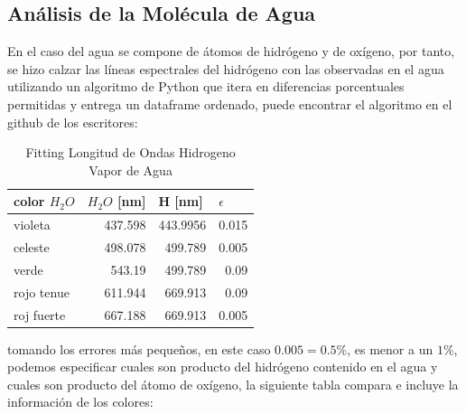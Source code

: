 \documentclass[a4paper,twocolumn,10pt]{article}
\begin{document}
\subsection{Análisis de la Molécula de Agua}

En el caso del agua se compone de átomos de hidrógeno y de oxígeno, por tanto, se hizo calzar las líneas espectrales del hidrógeno con las observadas en el agua utilizando un algoritmo de Python que itera en diferencias porcentuales permitidas y entrega un dataframe ordenado, puede encontrar el algoritmo en el github de los escritores: \cite{github}

\begin{table}[H]
\centering
\begin{tabular}{|l|r|r|r|}
\hline
color $H_2O$     & \multicolumn{1}{l}{$H_2O$ [nm]} & \multicolumn{1}{|l|}{H [nm]} & \multicolumn{1}{l|}{$\epsilon$}  \\
\hline
violeta    & 437.598                            & 443.9956                                  & 0.015                                       \\
celeste    & 498.078                            & 499.789                                   & 0.005                                       \\
verde    & 543.19                             & 499.789                                   & 0.09                                        \\
rojo tenue & 611.944                            & 669.913                                   & 0.09                                        \\
roj fuerte & 667.188                            & 669.913                                   & 0.005  \\ \hline                                    
\end{tabular}
\caption{Fitting Longitud de Ondas Hidrogeno Vapor de Agua}
\end{table}

tomando los errores más pequeños, en este caso $0.005 = 0.5 \% $, es menor a un $1\%$, podemos especificar cuales son producto del hidrógeno contenido en el agua y cuales son producto del átomo de oxígeno, la siguiente tabla compara e incluye la información de los colores:
\end{document}
